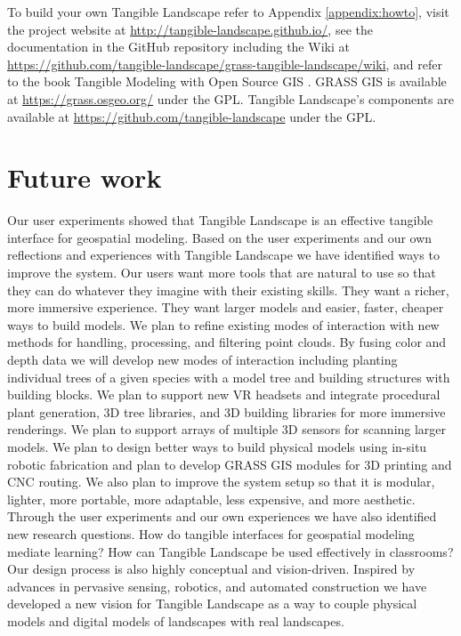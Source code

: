 \documentclass[prodmode,acmtochi]{acmsmall} %
\begin{document}
To build your own Tangible Landscape
refer to Appendix \ref{appendix:howto},
visit the project website at \url{http://tangible-landscape.github.io/}, 
see the documentation in the GitHub repository 
including the Wiki at \url{https://github.com/tangible-landscape/grass-tangible-landscape/wiki},
and refer to the book Tangible Modeling with Open Source GIS \cite{Petrasova2015}.
GRASS GIS is available at
\url{https://grass.osgeo.org/} 
under the GPL. 
Tangible Landscape's components are available at
\url{https://github.com/tangible-landscape}
under the GPL. 

\section{Future work}
Our user experiments showed that Tangible Landscape is
an effective tangible interface for geospatial modeling. 
Based on the user experiments and 
our own reflections and experiences with Tangible Landscape
we have identified ways to improve the system.  
Our users want more tools that are natural to use 
so that they can do whatever they imagine
with their existing skills. 
They want a richer, more immersive experience. 
They want larger models and easier, faster, cheaper ways to build models.
We plan to 
refine existing modes of interaction 
with new methods for handling, processing, and filtering point clouds.
By fusing color and depth data
we will develop new modes of interaction including
planting individual trees of a given species with a model tree
and building structures with building blocks. 
We plan to support new VR headsets and integrate 
procedural plant generation, 3D tree libraries, and 3D building libraries
for more immersive renderings. 
We plan to support arrays of multiple 3D sensors
for scanning larger models.
We plan to design better ways to build physical models
using in-situ robotic fabrication
and plan to develop GRASS GIS modules 
for 3D printing and CNC routing. 
We also plan to improve the system setup
so that it is modular, lighter, more portable, more adaptable, less expensive,
and more aesthetic.
Through the user experiments 
and our own experiences
we have also identified new research questions.
How do tangible interfaces for geospatial modeling mediate learning?
How can Tangible Landscape be used effectively in classrooms?
Our design process is also highly conceptual and vision-driven. 
Inspired by 
advances in pervasive sensing, robotics, and automated construction
we have developed a new vision for Tangible Landscape 
as a way to couple 
physical models and digital models of landscapes 
with real landscapes.
\end{document}
